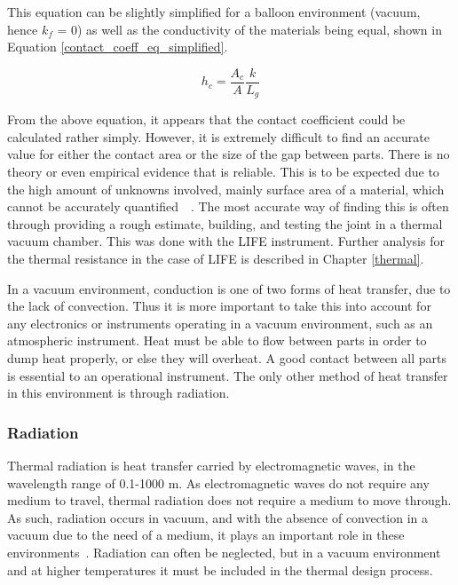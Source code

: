 This equation can be slightly simplified for a balloon environment (vacuum, hence $k_f$ = 0) as well as the conductivity of the materials being equal, shown in Equation \ref{contact_coeff_eq_simplified}.

\begin{equation}\label{contact_coeff_eq_simplified}
    h_c = \frac{A_c}{A}\frac{k}{L_g}
\end{equation}

From the above equation, it appears that the contact coefficient could be calculated rather simply. However, it is extremely difficult to find an accurate value for either the contact area or the size of the gap between parts. There is no theory or even empirical evidence that is reliable. This is to be expected due to the high amount of unknowns involved, mainly surface area of a material, which cannot be accurately quantified~\citep{Heat_Transfer_Resistance}~\citep{stephane_thermal_contact}. The most accurate way of finding this is often through providing a rough estimate, building, and testing the joint in a thermal vacuum chamber. This was done with the LIFE instrument. Further analysis for the thermal resistance in the case of LIFE is described in Chapter \ref{thermal}.

In a vacuum environment, conduction is one of two forms of heat transfer, due to the lack of convection. Thus it is more important to take this into account for any electronics or instruments operating in a vacuum environment, such as an atmospheric instrument. Heat must be able to flow between parts in order to dump heat properly, or else they will overheat. A good contact between all parts is essential to an operational instrument. The only other method of heat transfer in this environment is through radiation. 

\subsubsection{Radiation}\label{radiation_sec}
Thermal radiation is heat transfer carried by electromagnetic waves, in the wavelength range of 0.1-1000 \textmu m. As electromagnetic waves do not require any medium to travel, thermal radiation does not require a medium to move through. As such, radiation occurs in vacuum, and with the absence of convection in a vacuum due to the need of a medium, it plays an important role in these environments~\citep{Heat_Transfer_Basics}. Radiation can often be neglected, but in a vacuum environment and at higher temperatures it must be included in the thermal design process.

